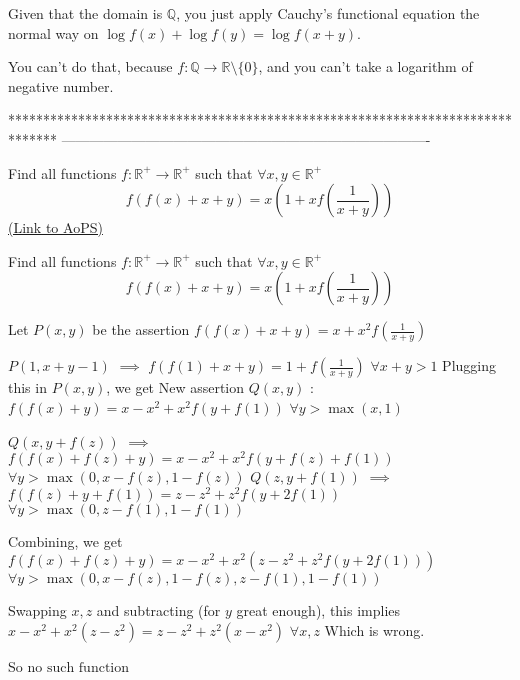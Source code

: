 \begin{solution}
	\begin{tcolorbox}Given that the domain is $\mathbb{Q}$, you just apply Cauchy's functional equation the normal way on $\log{f(x)}+\log{f(y)}=\log{f(x+y)}$.\end{tcolorbox}

You can't do that, because $f:\mathbb{Q}\rightarrow\mathbb{R} \setminus \{ 0 \}$, and you can't take a logarithm of negative number.
\end{solution}
*******************************************************************************
-------------------------------------------------------------------------------

\begin{problem}
	Find all functions $f:\mathbb{R^+}\to\mathbb{R^+}$ such that $\forall x,y\in\mathbb{R^+}$ \[f(f(x)+x+y)=x\left(1+xf\left(\frac{1}{x+y}\right)\right) \]
	\flushright \href{https://artofproblemsolving.com/community/c6h1157429}{(Link to AoPS)}
\end{problem}



\begin{solution}
	\begin{tcolorbox}Find all functions $f:\mathbb{R^+}\to\mathbb{R^+}$ such that $\forall x,y\in\mathbb{R^+}$ \[f(f(x)+x+y)=x\left(1+xf\left(\frac{1}{x+y}\right)\right) \]\end{tcolorbox}

Let $P(x,y)$ be the assertion $f(f(x)+x+y)=x+x^2f(\frac 1{x+y})$

$P(1,x+y-1)$ $\implies$ $f(f(1)+x+y)=1+f(\frac 1{x+y})$ $\forall x+y>1$
Plugging this in $P(x,y)$, we get 
New assertion $Q(x,y)$ : $f(f(x)+y)=x-x^2+x^2f(y+f(1))$ $\forall y>\max(x,1)$

$Q(x,y+f(z))$ $\implies$ $f(f(x)+f(z)+y)=x-x^2+x^2f(y+f(z)+f(1))$ $\forall y>\max(0,x-f(z),1-f(z))$
$Q(z,y+f(1))$ $\implies$ $f(f(z)+y+f(1))=z-z^2+z^2f(y+2f(1))$ $\forall y>\max(0,z-f(1),1-f(1))$

Combining, we get $f(f(x)+f(z)+y)=x-x^2+x^2(z-z^2+z^2f(y+2f(1)))$ $\forall y>\max(0,x-f(z),1-f(z),z-f(1),1-f(1))$

Swapping $x,z$ and subtracting (for $y$ great enough), this implies $x-x^2+x^2(z-z^2)=z-z^2+z^2(x-x^2)$ $\forall x,z$
Which is wrong.

So $\boxed{\text{no such function}}$

\end{solution}



